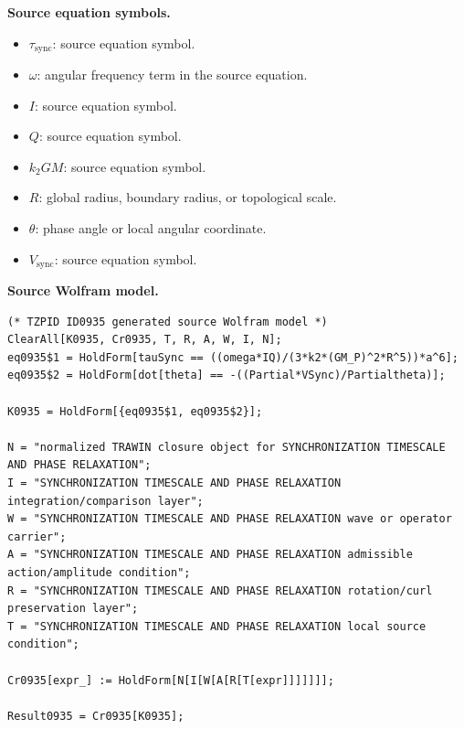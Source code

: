\begin{minipage}[t]{0.49\linewidth}
\begingroup
\small
\raggedright
\textbf{Source equation symbols.}\par
\begin{itemize}[leftmargin=1.35em,itemsep=1pt,topsep=1pt,parsep=0pt]
    \item $\tau_{\mathrm{sync}}$: source equation symbol.
    \item $\omega$: angular frequency term in the source equation.
    \item $I$: source equation symbol.
    \item $Q$: source equation symbol.
    \item $k_2GM$: source equation symbol.
    \item $R$: global radius, boundary radius, or topological scale.
    \item $\theta$: phase angle or local angular coordinate.
    \item $V_{\mathrm{sync}}$: source equation symbol.
\end{itemize}
\endgroup
\end{minipage}\hfill
\begin{minipage}[t]{0.47\linewidth}
\begingroup
\scriptsize
\raggedright
\textbf{Source Wolfram model.}\par
\begin{Verbatim}[fontsize=\tiny,breaklines=true,breakanywhere=true]
(* TZPID ID0935 generated source Wolfram model *)
ClearAll[K0935, Cr0935, T, R, A, W, I, N];
eq0935$1 = HoldForm[tauSync == ((omega*IQ)/(3*k2*(GM_P)^2*R^5))*a^6];
eq0935$2 = HoldForm[dot[theta] == -((Partial*VSync)/Partialtheta)];

K0935 = HoldForm[{eq0935$1, eq0935$2}];

N = "normalized TRAWIN closure object for SYNCHRONIZATION TIMESCALE AND PHASE RELAXATION";
I = "SYNCHRONIZATION TIMESCALE AND PHASE RELAXATION integration/comparison layer";
W = "SYNCHRONIZATION TIMESCALE AND PHASE RELAXATION wave or operator carrier";
A = "SYNCHRONIZATION TIMESCALE AND PHASE RELAXATION admissible action/amplitude condition";
R = "SYNCHRONIZATION TIMESCALE AND PHASE RELAXATION rotation/curl preservation layer";
T = "SYNCHRONIZATION TIMESCALE AND PHASE RELAXATION local source condition";

Cr0935[expr_] := HoldForm[N[I[W[A[R[T[expr]]]]]]];

Result0935 = Cr0935[K0935];
\end{Verbatim}
\endgroup
\end{minipage}


